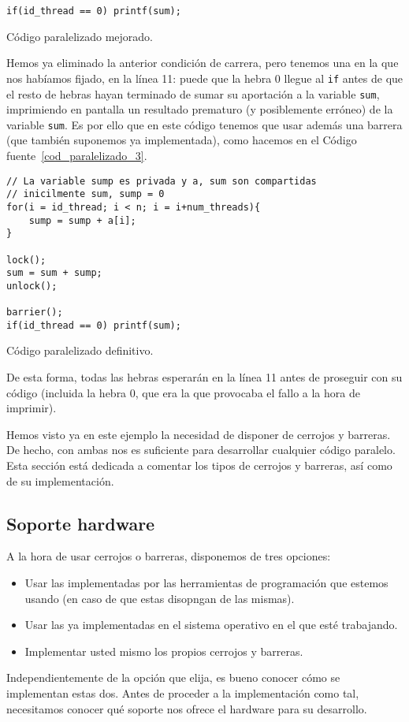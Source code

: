\begin{ejemplo}
\begin{listing}[H]
\begin{verbatim}
if(id_thread == 0) printf(sum);
\end{verbatim}
\caption{Código paralelizado mejorado.}
\label{cod_paralelizado_2}
\end{listing}
Hemos ya eliminado la anterior condición de carrera, pero tenemos una en la que nos habíamos fijado, en la línea 11: puede que la hebra 0 llegue al \verb|if| antes de que el resto de hebras hayan terminado de sumar su aportación a la variable \verb|sum|, imprimiendo en pantalla un resultado prematuro (y posiblemente erróneo) de la variable \verb|sum|. Es por ello que en este código tenemos que usar además una barrera (que también suponemos ya implementada), como hacemos en el Código fuente~\ref{cod_paralelizado_3}.
\begin{listing}[H]
\centering
\begin{verbatim}
// La variable sump es privada y a, sum son compartidas
// inicilmente sum, sump = 0
for(i = id_thread; i < n; i = i+num_threads){
    sump = sump + a[i];
}

lock();
sum = sum + sump;
unlock();

barrier();
if(id_thread == 0) printf(sum);
\end{verbatim}
\caption{Código paralelizado definitivo.}
\label{cod_paralelizado_3}
\end{listing}

De esta forma, todas las hebras esperarán en la línea 11 antes de proseguir con su código (incluida la hebra 0, que era la que provocaba el fallo a la hora de imprimir).
\end{ejemplo}
Hemos visto ya en este ejemplo la necesidad de disponer de cerrojos y barreras. De hecho, con ambas nos es suficiente para desarrollar cualquier código paralelo. Esta sección está dedicada a comentar los tipos de cerrojos y barreras, así como de su implementación.

\subsection{Soporte hardware}
A la hora de usar cerrojos o barreras, disponemos de tres opciones:
\begin{itemize}
    \item Usar las implementadas por las herramientas de programación que estemos usando (en caso de que estas disopngan de las mismas).
    \item Usar las ya implementadas en el sistema operativo en el que esté trabajando.
    \item Implementar usted mismo los propios cerrojos y barreras.
\end{itemize}
Independientemente de la opción que elija, es bueno conocer cómo se implementan estas dos. Antes de proceder a la implementación como tal, necesitamos conocer qué soporte nos ofrece el hardware para su desarrollo.\\

